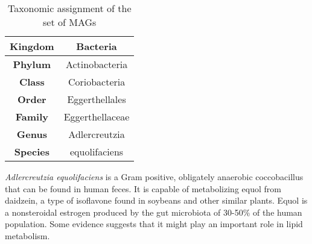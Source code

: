 \begin{table}[h]
\centering
\begin{tabular}{|c|c|}
    \hline
    \textbf{Kingdom} & Bacteria \\
    \hline
    \textbf{Phylum} & Actinobacteria \\
    \hline
    \textbf{Class} & Coriobacteria \\
    \hline
    \textbf{Order} & Eggerthellales \\
    \hline
    \textbf{Family} & Eggerthellaceae \\
    \hline
    \textbf{Genus} & Adlercreutzia \\
    \hline
    \textbf{Species} & equolifaciens \\
    \hline
\end{tabular}
\caption{\footnotesize{Taxonomic assignment of the set of MAGs}}
\label{tab:taxonomy}
\end{table}

\textit{Adlercreutzia equolifaciens} is a Gram positive, obligately anaerobic coccobacillus that can be found in human feces. It is capable of metabolizing equol from daidzein, a type of isoflavone found in soybeans and other similar plants\cite{Adlercreutzia}. Equol is a nonsteroidal estrogen produced by the gut microbiota of 30-50\% of the human population. Some evidence suggests that it might play an important role in lipid metabolism\cite{equol}.